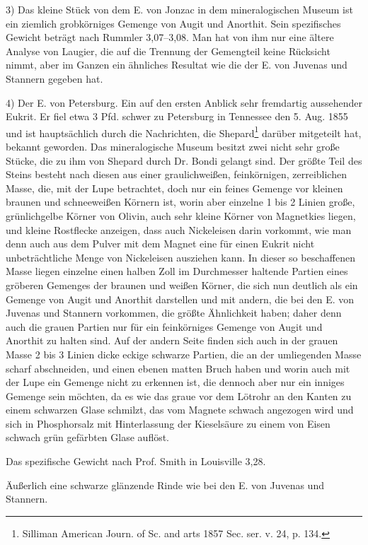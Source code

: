 \documentclass[a4paper, 11pt, oneside]{article}
\begin{document}
3) Das kleine Stück von dem E. von Jonzac in dem mineralogischen Museum ist ein ziemlich grobkörniges Gemenge von Augit und Anorthit. Sein spezifisches Gewicht beträgt nach Rummler 3,07--3,08. Man hat von ihm nur eine ältere Analyse von Laugier, die auf die Trennung der Gemengteil keine Rücksicht nimmt, aber im Ganzen ein ähnliches Resultat wie die der E. von Juvenas und Stannern gegeben hat.

4) Der E. von Petersburg. Ein auf den ersten Anblick sehr fremdartig aussehender Eukrit. Er fiel etwa 3 Pfd. schwer zu Petersburg in Tennessee den 5. Aug. 1855 und ist hauptsächlich durch die Nachrichten, die Shepard\footnote{Silliman American Journ. of Sc. and arts 1857 Sec. ser. v. 24, p. 134.} darüber mitgeteilt hat, bekannt geworden. Das mineralogische Museum besitzt zwei nicht sehr große Stücke, die zu ihm von Shepard durch Dr. Bondi gelangt sind. Der größte Teil des Steins besteht nach diesen aus einer graulichweißen, feinkörnigen, zerreiblichen Masse, die, mit der Lupe betrachtet, doch nur ein feines Gemenge vor kleinen braunen und schneeweißen Körnern ist, worin aber einzelne 1 bis 2 Linien große, grünlichgelbe Körner von Olivin, auch sehr kleine Körner von Magnetkies liegen, und kleine Rostflecke anzeigen, dass auch Nickeleisen darin vorkommt, wie man denn auch aus dem Pulver mit dem Magnet eine für einen Eukrit nicht unbeträchtliche Menge von Nickeleisen ausziehen kann. In dieser so beschaffenen Masse liegen einzelne einen halben Zoll im Durchmesser haltende Partien eines gröberen Gemenges der braunen und weißen Körner, die sich nun deutlich als ein Gemenge von Augit und Anorthit darstellen und mit andern, die bei den E. von Juvenas und Stannern vorkommen, die größte Ähnlichkeit haben; daher denn auch die grauen Partien nur für ein feinkörniges Gemenge von Augit und Anorthit zu halten sind. Auf der andern Seite finden sich auch in der grauen Masse 2 bis 3 Linien dicke eckige schwarze Partien, die an der umliegenden Masse scharf abschneiden, und einen ebenen matten Bruch haben und worin auch mit der Lupe ein Gemenge nicht zu erkennen ist, die dennoch aber nur ein inniges Gemenge sein möchten, da es wie das graue vor dem Lötrohr an den Kanten zu einem schwarzen Glase schmilzt, das vom Magnete schwach angezogen wird und sich in Phosphorsalz mit Hinterlassung der Kieselsäure zu einem von Eisen schwach grün gefärbten Glase auflöst.

Das spezifische Gewicht nach Prof. Smith in Louisville 3,28.

Äußerlich eine schwarze glänzende Rinde wie bei den E. von Juvenas und Stannern.
\end{document}
